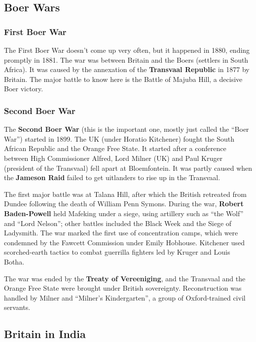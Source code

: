 \subsection*{Boer Wars}

\subsubsection*{First Boer War}

The First Boer War doesn't come up very often, but it happened in 1880, ending promptly in 1881.
The war was between Britain and the Boers (settlers in South Africa).
It was caused by the annexation of the \textbf{Transvaal Republic} in 1877 by Britain.
The major battle to know here is the Battle of Majuba Hill, a decisive Boer victory.

\subsubsection*{Second Boer War}

The \textbf{Second Boer War} (this is the important one, mostly just called the ``Boer War'') started in 1899.
The UK (under Horatio Kitchener) fought the South African Republic and the Orange Free State.
It started after a conference between High Commissioner Alfred, Lord Milner (UK)
and Paul Kruger (president of the Transvaal)
fell apart at Bloemfontein.
It was partly caused when the \textbf{Jameson Raid} failed to get uitlanders to rise up in the Transvaal.

The first major battle was at Talana Hill,
after which the British retreated from Dundee following the death of William Penn Symons.
During the war, \textbf{Robert Baden-Powell} held Mafeking under a siege,
using artillery such as ``the Wolf'' and ``Lord Nelson'';
other battles included the Black Week and the Siege of Ladysmith.
The war marked the first use of concentration camps,
which were condemned by the Fawcett Commission under Emily Hobhouse.
Kitchener used scorched-earth tactics to combat guerrilla fighters led by Kruger and Louis Botha.

The war was ended by the \textbf{Treaty of Vereeniging},
and the Transvaal and the Orange Free State were brought under British sovereignty.
Reconstruction was handled by Milner and ``Milner's Kindergarten'', a group of Oxford-trained civil servants.

\subsection*{Britain in India}
